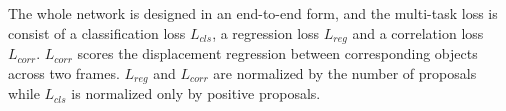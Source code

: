 \documentclass[letterpaper, 10 pt, conference]{ieeeconf}  %
\def\figurename{\emph{Figure}}
\begin{document}
The whole network is designed in an end-to-end form, and the multi-task loss is consist of a classification loss $L_{cls}$, a regression loss $L_{reg}$ and a correlation loss $L_{corr}$. $L_{corr}$ scores the displacement regression between corresponding objects across two frames. $L_{reg}$ and $L_{corr}$ are normalized by the number of proposals while $L_{cls}$ is normalized only by positive proposals.



\end{document}
